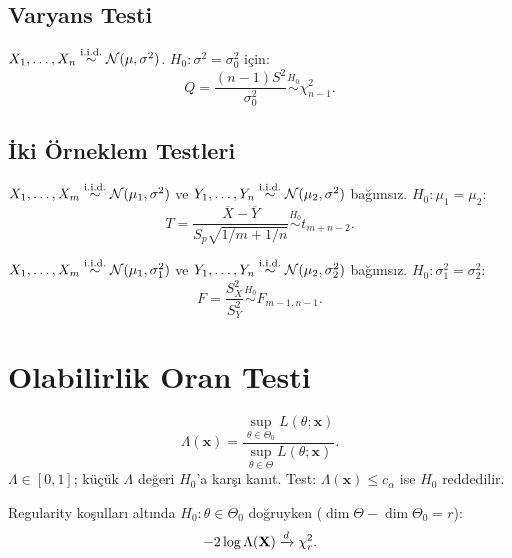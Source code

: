 \subsection{Varyans Testi}

\begin{teorem}\label{thm:chi2_testi}
$X_1,\ldots,X_n\overset{\text{i.i.d.}}{\sim}\mathcal{N}(\mu,\sigma^2)$. $H_0:\sigma^2=\sigma_0^2$ için:
\[
  Q = \frac{(n-1)S^2}{\sigma_0^2} \overset{H_0}{\sim} \chi^2_{n-1}.
\]
\end{teorem}

\subsection{İki Örneklem Testleri}

\begin{teorem}\label{thm:iki_t_testi}
$X_1,\ldots,X_m\overset{\text{i.i.d.}}{\sim}\mathcal{N}(\mu_1,\sigma^2)$ ve $Y_1,\ldots,Y_n\overset{\text{i.i.d.}}{\sim}\mathcal{N}(\mu_2,\sigma^2)$ bağımsız. $H_0:\mu_1=\mu_2$:
\[
  T = \frac{\overline{X}-\overline{Y}}{S_p\sqrt{1/m+1/n}} \overset{H_0}{\sim} t_{m+n-2}.
\]
\end{teorem}

\begin{teorem}\label{thm:f_testi}
$X_1,\ldots,X_m\overset{\text{i.i.d.}}{\sim}\mathcal{N}(\mu_1,\sigma_1^2)$ ve $Y_1,\ldots,Y_n\overset{\text{i.i.d.}}{\sim}\mathcal{N}(\mu_2,\sigma_2^2)$ bağımsız. $H_0:\sigma_1^2=\sigma_2^2$:
\[
  F = \frac{S_X^2}{S_Y^2} \overset{H_0}{\sim} F_{m-1,n-1}.
\]
\end{teorem}

\section{Olabilirlik Oran Testi}
\label{sec:lrt}

\begin{tanim}\label{def:lrt}
\[
  \Lambda(\mathbf{x}) = \frac{\sup_{\theta\in\Theta_0}L(\theta;\mathbf{x})}{\sup_{\theta\in\Theta}L(\theta;\mathbf{x})}.
\]
$\Lambda\in[0,1]$; küçük $\Lambda$ değeri $H_0$'a karşı kanıt. Test: $\Lambda(\mathbf{x})\leq c_\alpha$ ise $H_0$ reddedilir.
\end{tanim}

\begin{teorem}\label{thm:wilks}
Regularity koşulları altında $H_0:\theta\in\Theta_0$ doğruyken ($\dim\Theta-\dim\Theta_0 = r$):
\[
  -2\log\Lambda(\mathbf{X}) \xrightarrow{d} \chi^2_r.
\]
\end{teorem}

